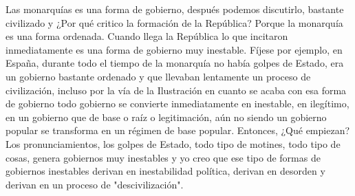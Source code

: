 Las monarquías es una forma de gobierno, después podemos discutirlo, bastante civilizado y ¿Por qué critico la formación de la República? Porque la monarquía es una forma ordenada. Cuando llega la República lo que incitaron inmediatamente es una forma de gobierno muy inestable. Fíjese por ejemplo, en España, durante todo el tiempo de la monarquía no había golpes de Estado, era un gobierno bastante ordenado y que llevaban lentamente un proceso de civilización, incluso por la vía de la Ilustración en cuanto se acaba con esa forma de gobierno todo gobierno se convierte inmediatamente en inestable, en ilegítimo, en un gobierno que de base o raíz o legitimación, aún no siendo un gobierno popular se transforma en un régimen de base popular. Entonces, ¿Qué empiezan? Los pronunciamientos, los golpes de Estado, todo tipo de motines, todo tipo de cosas, genera gobiernos muy inestables y yo creo que ese tipo de formas de gobiernos inestables derivan en inestabilidad política, derivan en desorden y derivan en un proceso de "descivilización".

